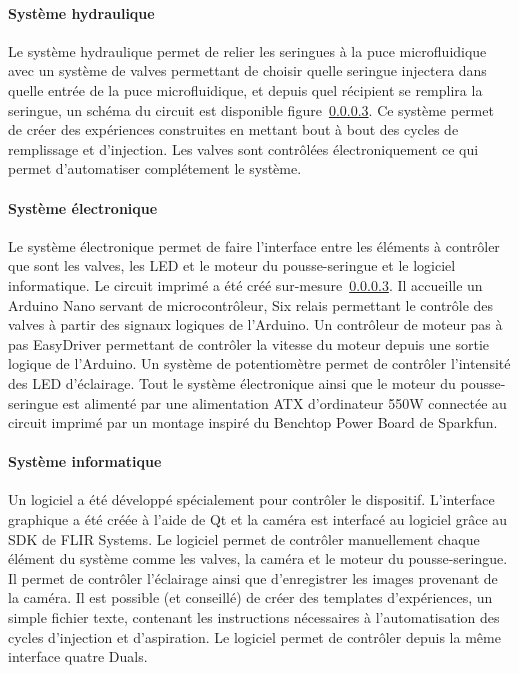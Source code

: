   \paragraph{Système hydraulique}
  Le système hydraulique permet de relier les seringues à la puce microfluidique avec un système de valves permettant de choisir quelle seringue injectera dans quelle entrée de la puce microfluidique, et depuis quel récipient se remplira la seringue, un schéma du circuit est disponible figure~\ref{}. Ce système permet de créer des expériences construites en mettant bout à bout des cycles de remplissage et d'injection. Les valves sont contrôlées électroniquement ce qui permet d'automatiser complétement le système.
  \paragraph{Système électronique}
  Le système électronique permet de faire l'interface entre les éléments à contrôler que sont les valves, les LED et le moteur du pousse-seringue et le logiciel informatique. Le circuit imprimé a été créé sur-mesure~\ref{}. Il accueille un Arduino Nano servant de microcontrôleur, Six relais permettant le contrôle des valves à partir des signaux logiques de l'Arduino. Un contrôleur de moteur pas à pas EasyDriver permettant de contrôler la vitesse du moteur depuis une sortie logique de l'Arduino. Un système de potentiomètre permet de contrôler l'intensité des LED d'éclairage. Tout le système électronique ainsi que le moteur du pousse-seringue est alimenté par une alimentation ATX d'ordinateur 550W connectée au circuit imprimé par un montage inspiré du Benchtop Power Board de Sparkfun.
  \paragraph{Système informatique}
  Un logiciel a été développé spécialement pour contrôler le dispositif. L'interface graphique a été créée à l'aide de Qt et la caméra est interfacé au logiciel grâce au SDK de FLIR Systems. Le logiciel permet de contrôler manuellement chaque élément du système comme les valves, la caméra et le moteur du pousse-seringue. Il permet de contrôler l'éclairage ainsi que d'enregistrer les images provenant de la caméra. Il est possible (et conseillé) de créer des templates d'expériences, un simple fichier texte, contenant les instructions nécessaires à l'automatisation des cycles d'injection et d'aspiration. Le logiciel permet de contrôler depuis la même interface quatre Duals.

